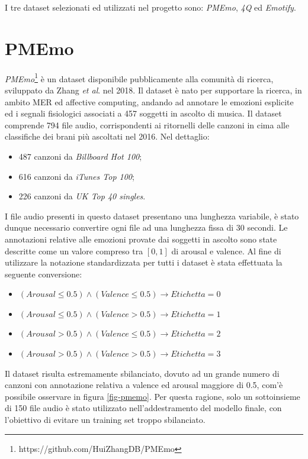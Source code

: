 \documentclass[11pt]{report}
\begin{document}
I tre dataset selezionati ed utilizzati nel progetto sono: \textit{PMEmo}\cite{zhang2018pmemo}, \textit{4Q}\cite{panda2018musical}\cite{panda2018novel} ed \textit{Emotify}\cite{aljanaki2014collecting}\cite{aljanaki2016studying}. 


\section{PMEmo}

\textit{PMEmo}\footnote{https://github.com/HuiZhangDB/PMEmo} è un dataset disponibile pubblicamente alla comunità di ricerca, sviluppato da Zhang \textit{et al}. \cite{zhang2018pmemo} nel 2018. Il dataset è nato per supportare la ricerca, in ambito MER ed affective computing, andando ad annotare le emozioni esplicite ed i segnali fisiologici associati a 457 soggetti in ascolto di musica. Il dataset comprende 794 file audio, corrispondenti ai ritornelli delle canzoni in cima alle classifiche dei brani più ascoltati nel 2016. Nel dettaglio:
\begin{itemize}
    \item 487 canzoni da \textit{Billboard Hot 100};     
    \item 616 canzoni da \textit{iTunes Top 100};
    \item 226 canzoni da \textit{UK Top 40 singles}.
\end{itemize}

I file audio presenti in questo dataset presentano una lunghezza variabile, è stato dunque necessario convertire ogni file ad una lunghezza fissa di 30 secondi. Le annotazioni relative alle emozioni provate dai soggetti in ascolto sono state descritte come un valore compreso tra $[0,1]$ di arousal e valence. Al fine di utilizzare la notazione standardizzata per tutti i dataset è stata effettuata la seguente conversione:

\begin{itemize}
    \item $(Arousal \le 0.5) \wedge (Valence \le 0.5) \to Etichetta = 0$
    \item $(Arousal \le 0.5) \wedge (Valence > 0.5) \to Etichetta = 1$
    \item $(Arousal > 0.5) \wedge (Valence \le 0.5) \to Etichetta = 2$
    \item $(Arousal > 0.5) \wedge (Valence > 0.5) \to Etichetta = 3$
\end{itemize}

Il dataset risulta estremamente sbilanciato, dovuto ad un grande numero di canzoni con annotazione relativa a valence ed arousal maggiore di 0.5, com'è possibile osservare in figura \ref{fig-pmemo}. Per questa ragione, solo un sottoinsieme di 150 file audio è stato utilizzato nell'addestramento del modello finale, con l'obiettivo di evitare un training set troppo sbilanciato.
\end{document}
